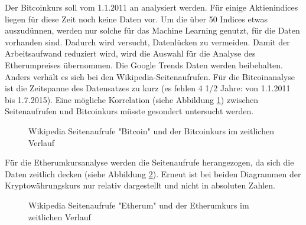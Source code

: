 Der Bitcoinkurs soll vom 1.1.2011 an analysiert werden. Für einige Aktienindices liegen für diese Zeit noch keine Daten vor. Um die über 50 Indices etwas auszudünnen, werden nur solche für das Machine Learning genutzt, für die Daten vorhanden sind. Dadurch wird versucht, Datenlücken zu vermeiden. Damit der Arbeitsaufwand reduziert wird, wird die Auswahl für die Analyse des Etherumpreises übernommen. Die Google Trends Daten werden beibehalten. Anders verhält es sich bei den Wikipedia-Seitenaufrufen. Für die Bitcoinanalyse ist die Zeitspanne des Datensatzes zu kurz (es fehlen 4 1/2 Jahre: von 1.1.2011 bis 1.7.2015). Eine mögliche Korrelation (siehe Abbildung \ref{fig:WikiBTC}) zwischen Seitenaufrufen und Bitcoinkurs müsste gesondert untersucht werden. 
\begin{figure}[H]
\caption{Wikipedia Seitenaufrufe "Bitcoin" und der Bitcoinkurs im zeitlichen Verlauf}
\label{fig:WikiBTC}
\centering
\end{figure}
Für die Etherumkursanalyse werden die Seitenaufrufe herangezogen, da sich die Daten zeitlich decken (siehe Abbildung \ref{fig:WikiETH}). Erneut ist bei beiden Diagrammen der Kryptowährungskurs nur relativ dargestellt und nicht in absoluten Zahlen. 
\begin{figure}[H]
\caption{Wikipedia Seitenaufrufe "Etherum" und der Etherumkurs im zeitlichen Verlauf}
\label{fig:WikiETH}
\centering
\end{figure}
